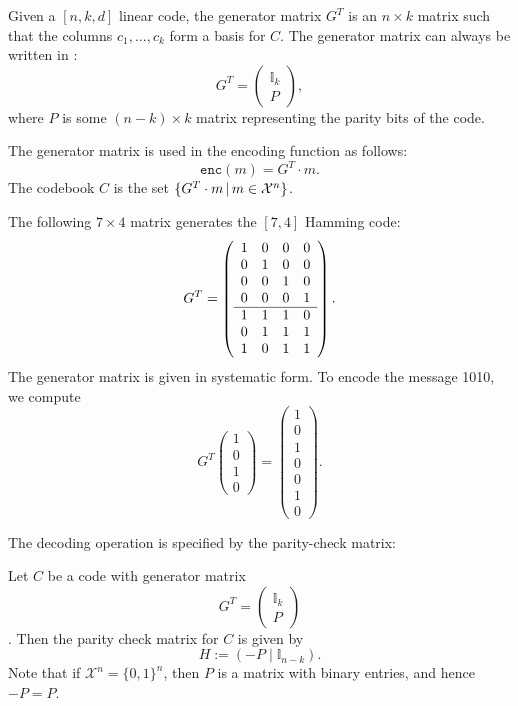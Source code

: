 \begin{definition}
Given a $[n,k,d]$ linear code, the generator matrix $G^T$ is an $n \times k$ matrix such that the columns $c_1, ..., c_k$ form a basis for $C$. The generator matrix can always be written in :
\[
G^T = 
\left(
\begin{array}{c}
\mathbb{I}_k\\
\hline
P
\end{array}
\right),
\]
where $P$ is some $(n-k) \times k$ matrix representing the parity bits of the code.
\end{definition}
The generator matrix is used in the encoding function as follows:
\[
\mathtt{enc}(m) = G^T \cdot m.
\]
The codebook $C$ is the set $\{G^T \cdot m\,|\,m \in \mathcal{X}^n\}$.

\begin{example}
The following $7 \times 4$ matrix generates the $[7,4]$ Hamming code:
\[
G^T = 
\left(
\begin{array}{c c c c}
1 & 0 & 0 & 0\\
0 & 1 & 0 & 0\\
0 & 0 & 1 & 0\\
0 & 0 & 0 & 1\\
\hline
1 & 1 & 1 & 0\\
0 & 1 & 1 & 1\\
1 & 0 & 1 & 1
\end{array}
\right).
\]
The generator matrix is given in systematic form. To encode the message 1010, we compute
\[
G^T \left(\begin{array}{c}
1\\0\\1\\0
\end{array}\right) = \left(\begin{array}{c}
1\\0\\1\\0\\0\\1\\0
\end{array}\right).
\]
\end{example}
The decoding operation is specified by the parity-check matrix:

\begin{definition}
Let $C$ be a code with generator matrix \[G^T = \left(\begin{array}{c}
\mathbb{I}_k\\\hline P
\end{array}\right)\]. Then the parity check matrix for $C$ is given by
\[
H := \left( - P \mid \mathbb{I}_{n-k}\right).
\]
Note that if $\mathcal{X}^n = \{0,1\}^n$, then $P$ is a matrix with binary entries, and hence $-P = P$.
\end{definition}

